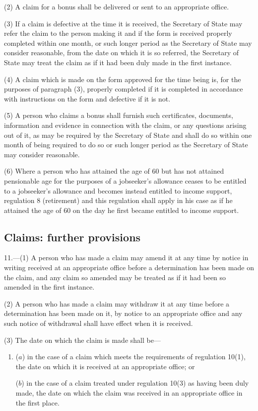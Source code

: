 \documentclass[a4paper]{article}
\begin{document}
(2) A claim for a bonus shall be delivered or sent to an appropriate office.

(3) If a claim is defective at the time it is received, the Secretary of State may refer the claim to the person making it and if the form is received properly completed within one month, or such longer period as the Secretary of State may consider reasonable, from the date on which it is so referred, the Secretary of State may treat the claim as if it had been duly made in the first instance.

(4) A claim which is made on the form approved for the time being is, for the purposes of paragraph (3), properly completed if it is completed in accordance with instructions on the form and defective if it is not.

(5) A person who claims a bonus shall furnish such certificates, documents, information and evidence in connection with the claim, or any questions arising out of it, as may be required by the Secretary of State and shall do so within one month of being required to do so or such longer period as the Secretary of State may consider reasonable.

(6) Where a person who has attained the age of 60 but has not attained pensionable age for the purposes of a jobseeker’s allowance ceases to be entitled to a jobseeker’s allowance and becomes instead entitled to income support, regulation 8 (retirement) and this regulation shall apply in his case as if he attained the age of 60 on the day he first became entitled to income support.

\subsection[11. Claims: further provisions]{Claims: further provisions}

11.—(1) A person who has made a claim may amend it at any time by notice in writing received at an appropriate office before a determination has been made on the claim, and any claim so amended may be treated as if it had been so amended in the first instance.

(2) A person who has made a claim may withdraw it at any time before a determination has been made on it, by notice to an appropriate office and any such notice of withdrawal shall have effect when it is received.

(3) The date on which the claim is made shall be—
\begin{enumerate}\item[]
($a$) in the case of a claim which meets the requirements of regulation 10(1), the date on which it is received at an appropriate office; or

($b$) in the case of a claim treated under regulation 10(3) as having been duly made, the date on which the claim was received in an appropriate office in the first place.
\end{enumerate}
\end{document}
